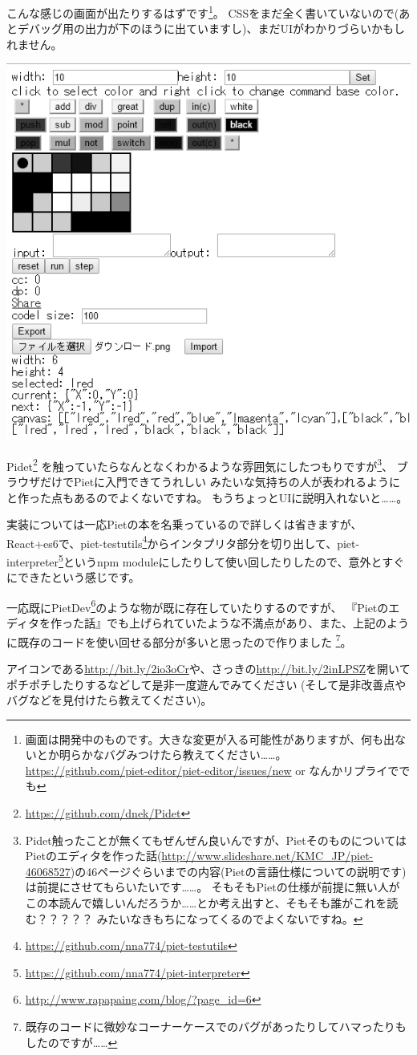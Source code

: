 こんな感じの画面が出たりするはずです\footnote{画面は開発中のものです。大きな変更が入る可能性がありますが、何も出ないとか明らかなバグみつけたら教えてください……。
\url{https://github.com/piet-editor/piet-editor/issues/new} or なんかリプライででも}。
CSSをまだ全く書いていないので(あとデバッグ用の出力が下のほうに出ていますし)、まだUIがわかりづらいかもしれません。
\begin{center}
  \includegraphics{images/editor_g.png}
\end{center}
Pidet\footnote{\url{https://github.com/dnek/Pidet}}
を触っていたらなんとなくわかるような雰囲気にしたつもりですが\footnote{Pidet触ったことが無くてもぜんぜん良いんですが、PietそのものについてはPietのエディタを作った話(\url{http://www.slideshare.net/KMC_JP/piet-46068527})の46ページぐらいまでの内容(Pietの言語仕様についての説明です)は前提にさせてもらいたいです……。
そもそもPietの仕様が前提に無い人がこの本読んで嬉しいんだろうか……とか考え出すと、そもそも誰がこれを読む？？？？？ みたいなきもちになってくるのでよくないですね。}、
ブラウザだけでPietに入門できてうれしい みたいな気持ちの人が表われるようにと作った点もあるのでよくないですね。
もうちょっとUIに説明入れないと……。

実装については一応Pietの本を名乗っているので詳しくは省きますが、React+es6で、piet-testutils\footnote{\url{https://github.com/nna774/piet-testutils}}からインタプリタ部分を切り出して、piet-interpreter\footnote{\url{https://github.com/nna774/piet-interpreter}}というnpm moduleにしたりして使い回したりしたので、意外とすぐにできたという感じです。

一応既にPietDev\footnote{\url{http://www.rapapaing.com/blog/?page_id=6}}のような物が既に存在していたりするのですが、
『Pietのエディタを作った話』でも上げられていたような不満点があり、また、上記のように既存のコードを使い回せる部分が多いと思ったので作りました
\footnote{既存のコードに微妙なコーナーケースでのバグがあったりしてハマったりもしたのですが……}。

アイコンである\url{http://bit.ly/2io3oCr}や、さっきの\url{http://bit.ly/2inLPSZ}を開いてポチポチしたりするなどして是非一度遊んでみてください
(そして是非改善点やバグなどを見付けたら教えてください)。
